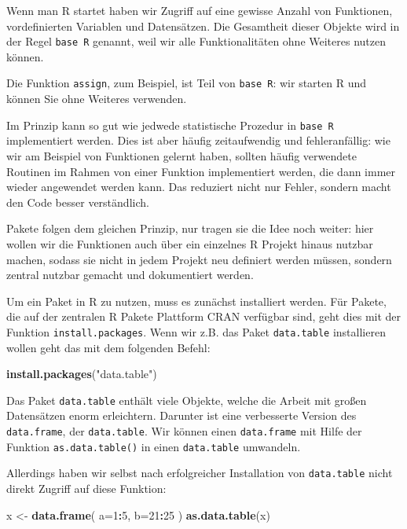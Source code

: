 \documentclass[]{book}
\newenvironment{Shaded}{\begin{snugshade}}{\end{snugshade}}
\newcommand{\KeywordTok}[1]{\textcolor[rgb]{0.13,0.29,0.53}{\textbf{#1}}}
\newcommand{\DataTypeTok}[1]{\textcolor[rgb]{0.13,0.29,0.53}{#1}}
\newcommand{\DecValTok}[1]{\textcolor[rgb]{0.00,0.00,0.81}{#1}}
\newcommand{\StringTok}[1]{\textcolor[rgb]{0.31,0.60,0.02}{#1}}
\newcommand{\OperatorTok}[1]{\textcolor[rgb]{0.81,0.36,0.00}{\textbf{#1}}}
\newcommand{\NormalTok}[1]{#1}
\begin{document}
Wenn man R startet haben wir Zugriff auf eine gewisse Anzahl von
Funktionen, vordefinierten Variablen und Datensätzen. Die Gesamtheit
dieser Objekte wird in der Regel \texttt{base\ R} genannt, weil wir alle
Funktionalitäten ohne Weiteres nutzen können.

Die Funktion \texttt{assign}, zum Beispiel, ist Teil von
\texttt{base\ R}: wir starten R und können Sie ohne Weiteres verwenden.

Im Prinzip kann so gut wie jedwede statistische Prozedur in
\texttt{base\ R} implementiert werden. Dies ist aber häufig
zeitaufwendig und fehleranfällig: wie wir am Beispiel von Funktionen
gelernt haben, sollten häufig verwendete Routinen im Rahmen von einer
Funktion implementiert werden, die dann immer wieder angewendet werden
kann. Das reduziert nicht nur Fehler, sondern macht den Code besser
verständlich.

Pakete folgen dem gleichen Prinzip, nur tragen sie die Idee noch weiter:
hier wollen wir die Funktionen auch über ein einzelnes R Projekt hinaus
nutzbar machen, sodass sie nicht in jedem Projekt neu definiert werden
müssen, sondern zentral nutzbar gemacht und dokumentiert werden.

Um ein Paket in R zu nutzen, muss es zunächst installiert werden. Für
Pakete, die auf der zentralen R Pakete Plattform CRAN verfügbar sind,
geht dies mit der Funktion \texttt{install.packages}. Wenn wir z.B. das
Paket \texttt{data.table} installieren wollen geht das mit dem folgenden
Befehl:

\begin{Shaded}
\begin{Highlighting}[]
\KeywordTok{install.packages}\NormalTok{(}\StringTok{"data.table"}\NormalTok{)}
\end{Highlighting}
\end{Shaded}

Das Paket \texttt{data.table} enthält viele Objekte, welche die Arbeit
mit großen Datensätzen enorm erleichtern. Darunter ist eine verbesserte
Version des \texttt{data.frame}, der \texttt{data.table}. Wir können
einen \texttt{data.frame} mit Hilfe der Funktion
\texttt{as.data.table()} in einen \texttt{data.table} umwandeln.

Allerdings haben wir selbst nach erfolgreicher Installation von
\texttt{data.table} nicht direkt Zugriff auf diese Funktion:

\begin{Shaded}
\begin{Highlighting}[]
\NormalTok{x <-}\StringTok{ }\KeywordTok{data.frame}\NormalTok{(}
  \DataTypeTok{a=}\DecValTok{1}\OperatorTok{:}\DecValTok{5}\NormalTok{,}
  \DataTypeTok{b=}\DecValTok{21}\OperatorTok{:}\DecValTok{25}
\NormalTok{)}
\KeywordTok{as.data.table}\NormalTok{(x)}
\end{Highlighting}
\end{Shaded}
\end{document}
